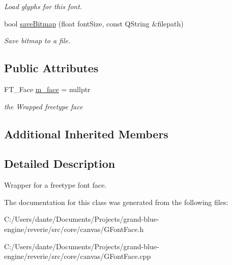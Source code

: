 \begin{Indent}
\begin{DoxyCompactItemize}
\begin{DoxyCompactList}\small\item\em Load glyphs for this font. \end{DoxyCompactList}\item 
\mbox{\label{classrev_1_1_font_face_afddbc5f8f0d3f3cc3acdf0794ef3c6c7}} 
bool \mbox{\hyperlink{classrev_1_1_font_face_afddbc5f8f0d3f3cc3acdf0794ef3c6c7}{save\+Bitmap}} (float font\+Size, const Q\+String \&filepath)
\begin{DoxyCompactList}\small\item\em Save bitmap to a file. \end{DoxyCompactList}\end{DoxyCompactItemize}
\end{Indent}
\subsection*{Public Attributes}
\begin{DoxyCompactItemize}
\item 
\mbox{\label{classrev_1_1_font_face_a99d5ac5c07f195eaf9fdd9278e34684e}} 
F\+T\+\_\+\+Face \mbox{\hyperlink{classrev_1_1_font_face_a99d5ac5c07f195eaf9fdd9278e34684e}{m\+\_\+face}} = nullptr
\begin{DoxyCompactList}\small\item\em the Wrapped freetype face \end{DoxyCompactList}\end{DoxyCompactItemize}
\subsection*{Additional Inherited Members}


\subsection{Detailed Description}
Wrapper for a freetype font face. 

The documentation for this class was generated from the following files\+:\begin{DoxyCompactItemize}
\item 
C\+:/\+Users/dante/\+Documents/\+Projects/grand-\/blue-\/engine/reverie/src/core/canvas/G\+Font\+Face.\+h\item 
C\+:/\+Users/dante/\+Documents/\+Projects/grand-\/blue-\/engine/reverie/src/core/canvas/G\+Font\+Face.\+cpp\end{DoxyCompactItemize}

